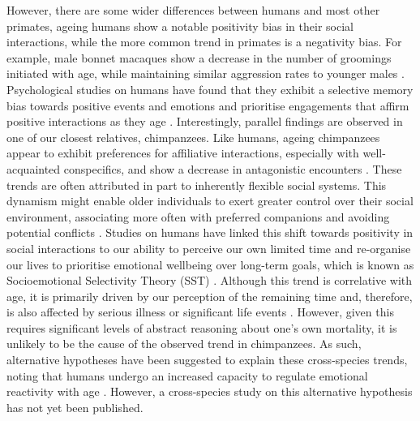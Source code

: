 However, there are some wider differences between humans and most other primates, ageing humans show a notable positivity bias in their social interactions, while the more common trend in primates is a negativity bias. For example, male bonnet macaques show a decrease in the number of groomings initiated with age, while maintaining similar aggression rates to younger males \citep{Silk.1994}. Psychological studies on humans have found that they exhibit a selective memory bias towards positive events and emotions and prioritise engagements that affirm positive interactions as they age \citep{Carstensen.1999}. Interestingly, parallel findings are observed in one of our closest relatives, chimpanzees. Like humans, ageing chimpanzees appear to exhibit preferences for affiliative interactions, especially with well-acquainted conspecifics, and show a decrease in antagonistic encounters \citep{Rosati.2020}.  These trends are often attributed in part to inherently flexible social systems. This dynamism might enable older individuals to exert greater control over their social environment, associating more often with preferred companions and avoiding potential conflicts \citep{Aureli.2008}. Studies on humans have linked this shift towards positivity in social interactions to our ability to perceive our own limited time and re-organise our lives to prioritise emotional wellbeing over long-term goals, which is known as Socioemotional Selectivity Theory (SST) \citep{Carstensen.1999}. Although this trend is correlative with age, it is primarily driven by our perception of the remaining time and, therefore, is also affected by serious illness or significant life events \citep{Löckenhoff.2004}. However, given this requires significant levels of abstract reasoning about one's own mortality, it is unlikely to be the cause of the observed trend in chimpanzees. As such, alternative hypotheses have been suggested to explain these cross-species trends, noting that humans undergo an increased capacity to regulate emotional reactivity with age \citep{Rosati.2020,Grühn.2016}. However, a cross-species study on this alternative hypothesis has not yet been published.

